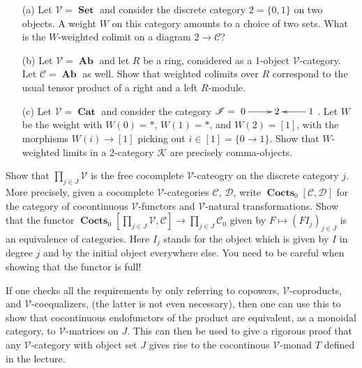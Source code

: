 \documentclass[12pt, a4paper]{article}
\DeclareMathOperator{\Cocts}{\mathbf{Cocts}}
\DeclareMathOperator{\Cat}{\mathbf{Cat}}
\DeclareMathOperator{\Set}{\mathbf{Set}}
\DeclareMathOperator{\Ab}{\mathbf{Ab}}
\newcommand{\ca}[1]{\mathscr{#1}}
\theoremstyle{plain}
\theoremstyle{definition}
\theoremstyle{citing}
\theoremstyle{citingdfn}
\numberwithin{equation}{section}
\begin{document}
\begin{question}
 \begin{enumerate}
  \item[(a)] Let $\ca{V}=\Set$ and consider the discrete category $2=\{0,1\}$ on two objects. A weight $W$ on this category amounts to a choice of two sets. What is the $W$-weighted colimit on a diagram $2 \rightarrow \ca{C}$?
  
  \item[(b)] Let $\ca{V}=\Ab$ and let $R$ be a ring, considered as a 1-object $\ca{V}$-category. Let $\ca{C}=\Ab$ as well. Show that weighted colimits over $R$ correspond to the usual tensor product of a right and a left $R$-module.
  
  \item[(c)] Let $\ca{V}=\Cat$ and consider the category $\ca{I}=\xymatrix{0 \ar[r] & 2 &  1 \ar[l]}$. Let $W$ be the weight with $W(0)=\ast$, $W(1)=\ast$, and $W(2)=[1]$, with the morphisms $W(i) \rightarrow [1]$ picking out $i \in [1]=\{0 \rightarrow 1\}$. Show that $W$-weighted limits in a 2-category $\ca{K}$ are precisely comma-objects.
 \end{enumerate}
 \end{question}

\begin{question}[subtitle=(bonus)]
 Show that $\prod_{j \in J} \ca{V}$ is the free cocomplete $\ca{V}$-cateogry on the discrete category $j$. More precisely, given a cocomplete $\ca{V}$-categories $\ca{C}$, $\ca{D}$, write $\Cocts_0[\ca{C},\ca{D}]$ for the category of cocontinuous $\ca{V}$-functors and $\ca{V}$-natural transformations. Show that the functor $ \Cocts_0[\prod\nolimits_{j \in J} \ca{V},\ca{C}] \rightarrow \prod_{j \in J}\ca{C}_0$ given by $F \mapsto (FI_j)_{j \in J}$ is an equivalence of categories. Here $I_j$ stands for the object which is given by $I$ in degree $j$ and by the initial object everywhere else. You need to be careful when showing that the functor is full! 
 
 If one checks all the requirements by only referring to copowers, $\ca{V}$-coproducts, and $\ca{V}$-coequalizers, (the latter is not even necessary), then one can use this to show that cocontinuous endofunctors of the product are equivalent, as a monoidal category, to $\ca{V}$-matrices on $J$. This can then be used to give a rigorous proof that any $\ca{V}$-category with object set $J$ gives rise to the cocontinous $\ca{V}$-monad $T$ defined in the lecture.
\end{question}
\end{document}
